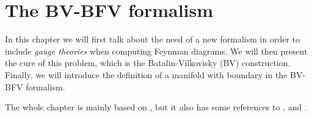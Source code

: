 \chapter{The BV-BFV formalism}
\label{chap:BV-BFV}

In this chapter we will first talk about the need of a new formalism in order to include \emph{gauge theories} when computing Feynman diagrams.
We will then present the cure of this problem, which is the Batalin-Vilkovisky (BV) construction.
Finally, we will introduce the definition of a manifold with boundary in the BV-BFV formalism.

The whole chapter is mainly based on \cite{Nima}, but it also has some references to \cite{Musio},\cite{Mnfd_boundaries} and \cite{Lectures}.



